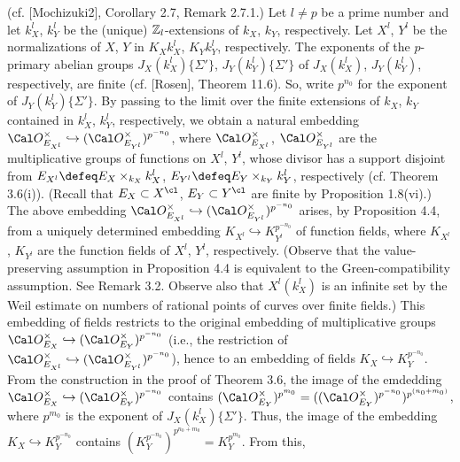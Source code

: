 (cf. [Mochizuki2], Corollary 2.7, Remark 2.7.1.) 
Let $l\neq p$ be a prime number and let $k_X^l$, $k_Y^l$ 
be the (unique) $\Bbb Z_l$-extensions of $k_X$, $k_Y$, respectively. 
Let $X^l$, $Y^l$ be the normalizations of $X$, $Y$ in $K_Xk_X^l$, $K_Yk_Y^l$, 
respectively.
The exponents of the $p$-primary 
abelian groups $J_X(k_X^l)\{\Sigma'\}$, $J_Y(k_Y^l)\{\Sigma'\}$ 
of $J_X(k_X^l)$, $J_Y(k_Y^l)$, respectively, are finite 
(cf. [Rosen], Theorem 11.6). 
So, write $p^{n_0}$ for the exponent of $J_Y(k_Y^l)\{\Sigma'\}$. 
By passing to the limit over the finite extensions of $k_X$, $k_Y$ 
contained in $k_X^l$, $k_Y^l$, respectively, we obtain a natural embedding 
$\Cal O_{E_{X^{l}}}^{\times} \hookrightarrow 
(\Cal O_{E_{Y^{l}}}^{\times})^{p^{-{n_0}}}$, 
where $\Cal O_{E_{X^{l}}}^{\times}$, $\Cal O_{E_{Y^{l}}}^{\times}$ are 
the multiplicative groups of functions on $X^l$, $Y^l$, whose divisor has 
a support disjoint from 
$E_{X^{l}}\defeq E_X\times _{k_X} k_X^l$, 
$E_{Y^{l}}\defeq E_Y\times _{k_Y} k_Y^l$, respectively
(cf. Theorem 3.6(i)). 
(Recall that $E_X\subset X^{\cl}$, $E_Y\subset Y^{\cl}$ are finite 
by Proposition 1.8(vi).) 
The above embedding $\Cal O_{E_{X^{l}}}^{\times} 
\hookrightarrow (\Cal O_{E_{Y^{l}}}^{\times})^{p^{-{n_0}}}$
arises, by Proposition 4.4, from a uniquely determined embedding $K_{X^l}
\hookrightarrow K_{Y^l}^{p^{-{n_0}}}$ of function fields, 
where $K_{X^l}$, $K_{Y^l}$ are the function fields of $X^l$, $Y^l$, respectively. 
(Observe that the value-preserving assumption in Proposition 4.4 
is equivalent to the 
Green-compatibility assumption. See Remark 3.2. 
Observe also that $X^l(k_X^l)$ is an infinite set by the Weil estimate 
on numbers of rational points of curves over finite fields.) 
This embedding of fields 
restricts to the original embedding of multiplicative groups
$\Cal O_{E_{X}}^{\times} \hookrightarrow (\Cal O_{E_{Y}}^{\times})^{p^{-{n_0}}}$ 
(i.e., the restriction of $\Cal O_{E_{X^{l}}}^{\times} \hookrightarrow 
(\Cal O_{E_{Y^{l}}}^{\times})^{p^{-{n_0}}}$), 
hence to an embedding of fields 
$K_X\hookrightarrow K_Y^{p^{-{n_0}}}$. From the 
construction in the proof of Theorem 3.6,  
the image of the emdedding 
$\Cal O_{E_{X}}^{\times} \hookrightarrow (\Cal O_{E_{Y}}^{\times})^{p^{-{n_0}}}$ 
contains $(\Cal O_{E_{Y}}^{\times})^{p^{m_0}}=
((\Cal O_{E_{Y}}^{\times})^{p^{-{n_0}}})^{p^{(n_0+m_0)}}$, where 
$p^{m_0}$ is the exponent of $J_X(k_X^l)\{\Sigma'\}$. Thus, the 
image of the embedding $K_X\hookrightarrow K_Y^{p^{-{n_0}}}$ contains 
$(K_Y^{p^{-{n_0}}})^{p^{n_0+m_0}}=K_Y^{p^{{m_0}}}$. From this, 
